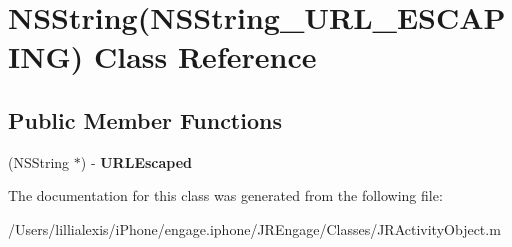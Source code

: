 \hypertarget{interface_n_s_string_07_n_s_string___u_r_l___e_s_c_a_p_i_n_g_08}{
\section{NSString(NSString\_\-URL\_\-ESCAPING) Class Reference}
\label{interface_n_s_string_07_n_s_string___u_r_l___e_s_c_a_p_i_n_g_08}
}
\subsection*{Public Member Functions}
\begin{DoxyCompactItemize}
\item 
\hypertarget{interface_n_s_string_07_n_s_string___u_r_l___e_s_c_a_p_i_n_g_08_aaea942f97a75942b2f51cd854ddd37a2}{
(NSString $\ast$) -\/ {\bfseries URLEscaped}}
\label{interface_n_s_string_07_n_s_string___u_r_l___e_s_c_a_p_i_n_g_08_aaea942f97a75942b2f51cd854ddd37a2}

\end{DoxyCompactItemize}


The documentation for this class was generated from the following file:\begin{DoxyCompactItemize}
\item 
/Users/lillialexis/iPhone/engage.iphone/JREngage/Classes/JRActivityObject.m\end{DoxyCompactItemize}

